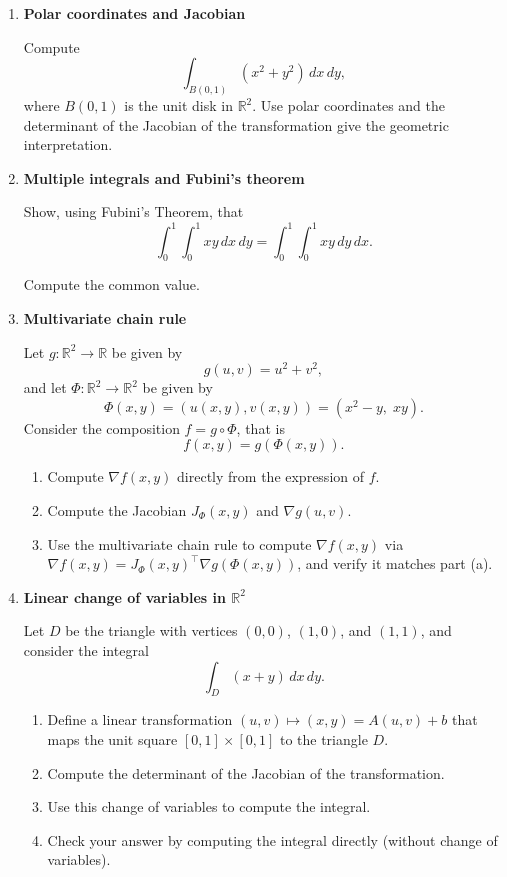 \documentclass[11pt]{article}
\begin{document}
\begin{enumerate}
\bigskip
\item \textbf{Polar coordinates and Jacobian}

Compute
\[
\int_{B(0,1)} (x^2+y^2)\,dx\,dy,
\]
where \(B(0,1)\) is the unit disk in \(\mathbb{R}^2\). Use polar coordinates and the determinant of the Jacobian of the transformation give the geometric interpretation.

\bigskip
\item \textbf{Multiple integrals and Fubini’s theorem}

Show, using Fubini’s Theorem, that
\[
\int_0^1\int_0^1 xy\,dx\,dy=\int_0^1\int_0^1 xy\,dy\,dx.
\]

Compute the common value.

\bigskip
\item \textbf{Multivariate chain rule}

Let \(g:\mathbb{R}^2\to\mathbb{R}\) be given by
\[
g(u,v)=u^2+v^2,
\]
and let \(\Phi:\mathbb{R}^2\to\mathbb{R}^2\) be given by
\[
\Phi(x,y) = (u(x,y),v(x,y)) = (x^2-y,\; xy).
\]
Consider the composition \(f=g\circ \Phi\), that is
\[
f(x,y)=g(\Phi(x,y)).
\]

\begin{enumerate}
\item Compute \(\nabla f(x,y)\) directly from the expression of \(f\).
\item Compute the Jacobian \(J_\Phi(x,y)\) and \(\nabla g(u,v)\).
\item Use the multivariate chain rule to compute \(\nabla f(x,y)\) via
\(\nabla f(x,y) = J_\Phi(x,y)^\top \nabla g(\Phi(x,y))\),
and verify it matches part (a).
\end{enumerate}

\bigskip
\item \textbf{Linear change of variables in \(\mathbb{R}^2\)}

Let \(D\) be the triangle with vertices \((0,0)\), \((1,0)\), and \((1,1)\), and consider the integral
\[
\int_D (x+y)\,dx\,dy.
\]

\begin{enumerate}
\item Define a linear transformation \((u,v)\mapsto(x,y)=A(u,v)+b\) that maps the unit square \([0,1]\times[0,1]\) to the triangle \(D\).
\item Compute the determinant of the Jacobian of the transformation.
\item Use this change of variables to compute the integral.
\item Check your answer by computing the integral directly (without change of variables).
\end{enumerate}

\end{enumerate}
\end{document}
